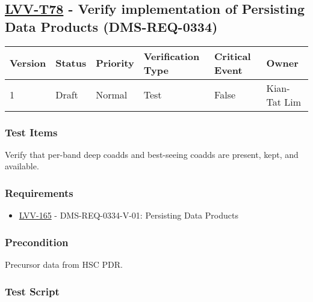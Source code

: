 \hypertarget{lvv-t78---verify-implementation-of-persisting-data-products-dms-req-0334}{%
\subsection{\texorpdfstring{\href{https://jira.lsstcorp.org/secure/Tests.jspa\#/testCase/LVV-T78}{LVV-T78}
- Verify implementation of Persisting Data Products
(DMS-REQ-0334)}{LVV-T78 - Verify implementation of Persisting Data Products (DMS-REQ-0334)}}\label{lvv-t78---verify-implementation-of-persisting-data-products-dms-req-0334}}

\begin{longtable}[]{@{}llllll@{}}
\toprule
Version & Status & Priority & Verification Type & Critical Event &
Owner\tabularnewline
\midrule
\endhead
1 & Draft & Normal & Test & False & Kian-Tat Lim\tabularnewline
\bottomrule
\end{longtable}

\hypertarget{test-items-54}{%
\subsubsection{Test Items}\label{test-items-54}}

Verify that per-band deep coadds and best-seeing coadds are present,
kept, and available.

\hypertarget{requirements-55}{%
\subsubsection{Requirements}\label{requirements-55}}

\begin{itemize}
\tightlist
\item
  \href{https://jira.lsstcorp.org/browse/LVV-165}{LVV-165} -
  DMS-REQ-0334-V-01: Persisting Data Products
\end{itemize}

\hypertarget{precondition-9}{%
\subsubsection{Precondition}\label{precondition-9}}

Precursor data from HSC PDR.

\hypertarget{test-script-55}{%
\subsubsection{Test Script}\label{test-script-55}}

